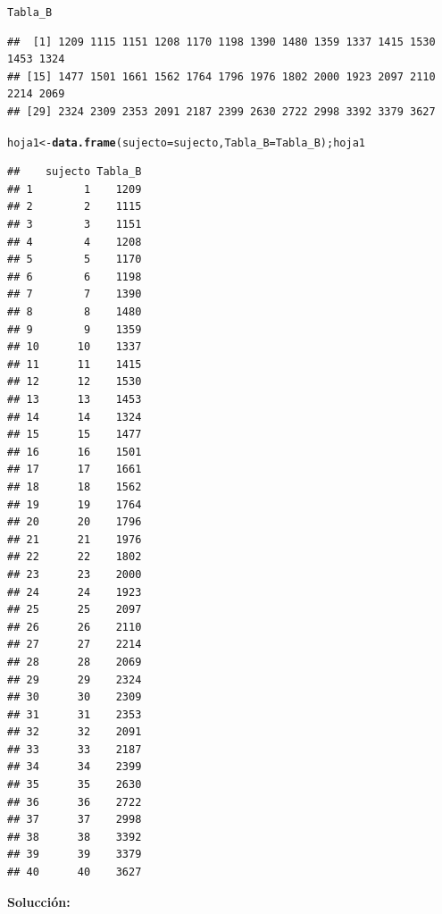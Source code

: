 \documentclass[12pt,letterpaper]{article}\usepackage[]{graphicx}\usepackage[]{color}
\makeatletter
\newcommand{\hlstd}[1]{\textcolor[rgb]{0.345,0.345,0.345}{#1}}%
\newcommand{\hlkwb}[1]{\textcolor[rgb]{0.69,0.353,0.396}{#1}}%
\newcommand{\hlkwc}[1]{\textcolor[rgb]{0.333,0.667,0.333}{#1}}%
\newcommand{\hlkwd}[1]{\textcolor[rgb]{0.737,0.353,0.396}{\textbf{#1}}}%
\newenvironment{kframe}{%
 \def\at@end@of@kframe{}%
 \ifinner\ifhmode%
  \def\at@end@of@kframe{\end{minipage}}%
  \begin{minipage}{\columnwidth}%
 \fi\fi%
 \def\FrameCommand##1{\hskip\@totalleftmargin \hskip-\fboxsep
 \colorbox{shadecolor}{##1}\hskip-\fboxsep
     \hskip-\linewidth \hskip-\@totalleftmargin \hskip\columnwidth}%
 \MakeFramed {\advance\hsize-\width
   \@totalleftmargin\z@ \linewidth\hsize
   \@setminipage}}%
 {\par\unskip\endMakeFramed%
 \at@end@of@kframe}
\newenvironment{knitrout}{}{} %
\makeatother
\begin{document}
\begin{knitrout}
\begin{kframe}
\begin{alltt}
\hlstd{Tabla_B}
\end{alltt}
\begin{verbatim}
##  [1] 1209 1115 1151 1208 1170 1198 1390 1480 1359 1337 1415 1530 1453 1324
## [15] 1477 1501 1661 1562 1764 1796 1976 1802 2000 1923 2097 2110 2214 2069
## [29] 2324 2309 2353 2091 2187 2399 2630 2722 2998 3392 3379 3627
\end{verbatim}
\begin{alltt}
\hlstd{hoja1} \hlkwb{<-} \hlkwd{data.frame}\hlstd{(}\hlkwc{sujecto}\hlstd{=sujecto,} \hlkwc{Tabla_B}\hlstd{=Tabla_B); hoja1}
\end{alltt}
\begin{verbatim}
##    sujecto Tabla_B
## 1        1    1209
## 2        2    1115
## 3        3    1151
## 4        4    1208
## 5        5    1170
## 6        6    1198
## 7        7    1390
## 8        8    1480
## 9        9    1359
## 10      10    1337
## 11      11    1415
## 12      12    1530
## 13      13    1453
## 14      14    1324
## 15      15    1477
## 16      16    1501
## 17      17    1661
## 18      18    1562
## 19      19    1764
## 20      20    1796
## 21      21    1976
## 22      22    1802
## 23      23    2000
## 24      24    1923
## 25      25    2097
## 26      26    2110
## 27      27    2214
## 28      28    2069
## 29      29    2324
## 30      30    2309
## 31      31    2353
## 32      32    2091
## 33      33    2187
## 34      34    2399
## 35      35    2630
## 36      36    2722
## 37      37    2998
## 38      38    3392
## 39      39    3379
## 40      40    3627
\end{verbatim}
\end{kframe}
\end{knitrout}

\textbf{Solucci\'on:}
\end{document}

